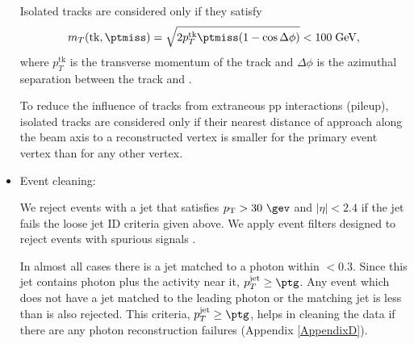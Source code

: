 \begin{itemize}
  Isolated tracks are considered only if they satisfy
  \begin{equation}\label{eq:mt_isotk}
    m_{T}(\mathrm{tk},\ptmiss) = \sqrt{2p_{T}^{\mathrm{tk}}\ptmiss(1-\cos\Delta\phi)}<100\;\mathrm{GeV},
  \end{equation}
  where $p_{T}^{\mathrm{tk}}$ is the transverse momentum of the track and
  $\Delta\phi$ is the azimuthal separation between the track and \ptvecmiss.

  To reduce the influence of tracks from extraneous pp interactions (pileup),
  isolated tracks are considered only if their nearest distance of approach
  along the beam axis to a reconstructed vertex
  is smaller for the primary event vertex than for any other vertex.

\item Event cleaning:

  We reject events with a jet that satisfies $\pt>30\ \gev$ and
  $|\eta|<2.4$ if the jet fails the loose jet ID criteria given above.
  We apply event filters designed to reject events with
  spurious \ptmiss signals \cite{CMS-PAS-JME-16-004}. 
  
  In almost all cases
  there is a jet matched to a photon within \dR $<0.3$.
  Since this jet contains photon plus the activity near it, $p_{T}^{\mathrm{jet}} \geq \ptg $.
  Any event which does not have a jet matched to the leading photon or the matching jet \pt
  is less than \ptg is also rejected. This criteria,  $p_{T}^{\mathrm{jet}} \geq \ptg $,
  helps in cleaning the data if there are any photon reconstruction failures (Appendix \ref{AppendixD}).
\end{itemize}


